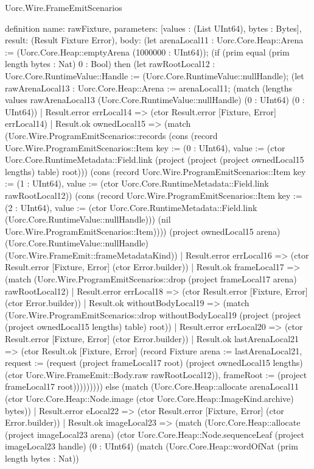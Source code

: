 \begin{lexlean}{Uorc.Wire.FrameEmitScenarios}
\begin{semanticmodule}
definition{
  name: rawFixture,
  parameters: [values : (List UInt64), bytes : Bytes],
  result: (Result Fixture Error),
  body: (let arenaLocal11 : Uorc.Core.Heap::Arena := (Uorc.Core.Heap::emptyArena (1000000 : UInt64)); (if (prim equal (prim length bytes : Nat) 0 : Bool) then (let rawRootLocal12 : Uorc.Core.RuntimeValue::Handle := (Uorc.Core.RuntimeValue::nullHandle); (let rawArenaLocal13 : Uorc.Core.Heap::Arena := arenaLocal11; (match (lengths values rawArenaLocal13 (Uorc.Core.RuntimeValue::nullHandle) (0 : UInt64) (0 : UInt64))
    | Result.error errLocal14 => (ctor Result.error [Fixture, Error] errLocal14)
    | Result.ok ownedLocal15 => (match (Uorc.Wire.ProgramEmitScenarios::records (cons (record Uorc.Wire.ProgramEmitScenarios::Item {key := (0 : UInt64), value := (ctor Uorc.Core.RuntimeMetadata::Field.link (project (project (project ownedLocal15 lengths) table) root))}) (cons (record Uorc.Wire.ProgramEmitScenarios::Item {key := (1 : UInt64), value := (ctor Uorc.Core.RuntimeMetadata::Field.link rawRootLocal12)}) (cons (record Uorc.Wire.ProgramEmitScenarios::Item {key := (2 : UInt64), value := (ctor Uorc.Core.RuntimeMetadata::Field.link (Uorc.Core.RuntimeValue::nullHandle))}) (nil Uorc.Wire.ProgramEmitScenarios::Item)))) (project ownedLocal15 arena) (Uorc.Core.RuntimeValue::nullHandle) (Uorc.Wire.FrameEmit::frameMetadataKind))
      | Result.error errLocal16 => (ctor Result.error [Fixture, Error] (ctor Error.builder))
      | Result.ok frameLocal17 => (match (Uorc.Wire.ProgramEmitScenarios::drop (project frameLocal17 arena) rawRootLocal12)
        | Result.error errLocal18 => (ctor Result.error [Fixture, Error] (ctor Error.builder))
        | Result.ok withoutBodyLocal19 => (match (Uorc.Wire.ProgramEmitScenarios::drop withoutBodyLocal19 (project (project (project ownedLocal15 lengths) table) root))
          | Result.error errLocal20 => (ctor Result.error [Fixture, Error] (ctor Error.builder))
          | Result.ok lastArenaLocal21 => (ctor Result.ok [Fixture, Error] (record Fixture {arena := lastArenaLocal21, request := (request (project frameLocal17 root) (project ownedLocal15 lengths) (ctor Uorc.Wire.FrameEmit::Body.raw rawRootLocal12)), frameRoot := (project frameLocal17 root)})))))))) else (match (Uorc.Core.Heap::allocate arenaLocal11 (ctor Uorc.Core.Heap::Node.image (ctor Uorc.Core.Heap::ImageKind.archive) bytes))
    | Result.error eLocal22 => (ctor Result.error [Fixture, Error] (ctor Error.builder))
    | Result.ok imageLocal23 => (match (Uorc.Core.Heap::allocate (project imageLocal23 arena) (ctor Uorc.Core.Heap::Node.sequenceLeaf (project imageLocal23 handle) (0 : UInt64) (match (Uorc.Core.Heap::wordOfNat (prim length bytes : Nat))
}
\end{semanticmodule}
\end{lexlean}
